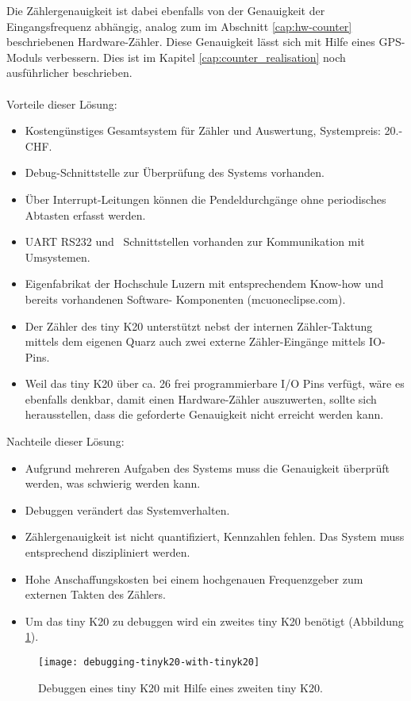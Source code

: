     	Die Zählergenauigkeit ist dabei ebenfalls von der Genauigkeit der Eingangsfrequenz abhängig, analog zum im Abschnitt \ref{cap:hw-counter} beschriebenen Hardware-Zähler. Diese Genauigkeit lässt sich mit Hilfe eines GPS-Moduls verbessern. Dies ist im Kapitel \ref{cap:counter_realisation} noch ausführlicher beschrieben.\\
        \\
    	Vorteile dieser Lösung:
    	\begin{itemize}
    		\item Kostengünstiges Gesamtsystem für Zähler und Auswertung, Systempreis: 20.- CHF.
    		\item Debug-Schnittstelle zur Überprüfung des Systems vorhanden.
    		\item Über Interrupt-Leitungen können die Pendeldurchgänge ohne periodisches Abtasten erfasst werden.
    		\item UART RS232 und \iic\ Schnittstellen vorhanden zur Kommunikation mit Umsystemen.
    		\item Eigenfabrikat der Hochschule Luzern mit entsprechendem Know-how und bereits vorhandenen Software- Komponenten (mcuoneclipse.com).
    		\item Der Zähler des tiny K20 unterstützt nebst der internen Zähler-Taktung mittels dem eigenen Quarz auch zwei externe Zähler-Eingänge mittels IO-Pins.
    		\item Weil das tiny K20 über ca. 26 frei programmierbare I/O Pins verfügt, wäre es ebenfalls denkbar, damit einen Hardware-Zähler auszuwerten, sollte sich herausstellen, dass die geforderte Genauigkeit nicht erreicht werden kann.
    	\end{itemize}
    	Nachteile dieser Lösung:
    	\begin{itemize}
    		\item Aufgrund mehreren Aufgaben des Systems muss die Genauigkeit überprüft werden, was schwierig werden kann.
    		\item Debuggen verändert das Systemverhalten.
    		\item Zählergenauigkeit ist nicht quantifiziert, Kennzahlen fehlen. Das System muss entsprechend diszipliniert werden.
    		\item Hohe Anschaffungskosten bei einem hochgenauen Frequenzgeber zum externen Takten des Zählers.
    		\item Um das tiny K20 zu debuggen wird ein zweites tiny K20 benötigt (Abbildung \ref{fig:dbg_tiny_tiny}).
    	\end{itemize}
	\begin{figure}[H]
		\centering
		\texttt{[image: debugging-tinyk20-with-tinyk20]}
		\caption{Debuggen eines tiny K20 mit Hilfe eines zweiten tiny K20.}
		\label{fig:dbg_tiny_tiny}
	\end{figure}		
